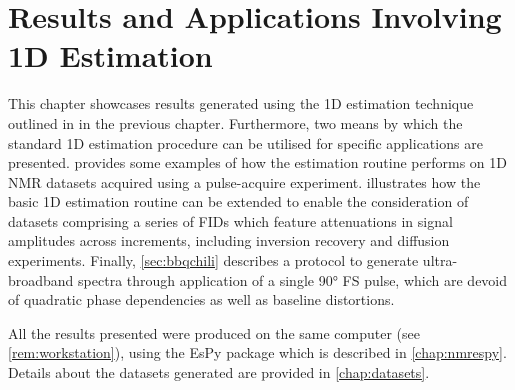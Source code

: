 \chapter{Results and Applications Involving 1D Estimation}
\label{chap:results}

This chapter showcases results generated using the \ac{1D} estimation
technique outlined in in the previous chapter. Furthermore, two means by
which the standard \ac{1D} estimation procedure can be utilised for
specific applications are presented.
 provides some examples of how the estimation
routine performs on \ac{1D} \ac{NMR} datasets acquired using a pulse-acquire
experiment.  illustrates how the basic \ac{1D} estimation routine
can be extended to enable the consideration of datasets comprising a series of
\acp{FID} which feature attenuations in signal amplitudes across increments,
including inversion recovery and diffusion experiments. Finally,
\cref{sec:bbqchili} describes a protocol to generate ultra-broadband spectra
through application of a single \ang{90} \acl{FS} pulse, which are devoid of
quadratic phase dependencies as well as baseline distortions.

All the results presented were produced on the same computer (see
\cref{rem:workstation}), using the \ac{EsPy} package which is
described in \cref{chap:nmrespy}. Details about the datasets generated are
provided in \cref{chap:datasets}.





